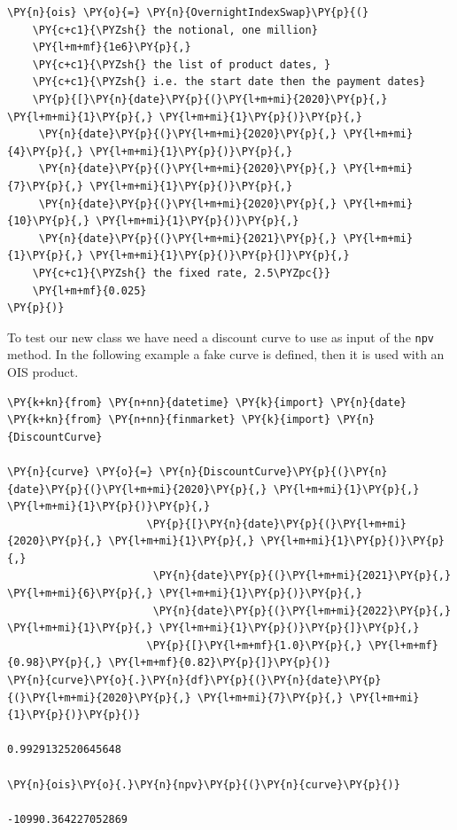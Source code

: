 \begin{tcolorbox}[breakable, size=fbox, boxrule=1pt, pad at break*=1mm,colback=cellbackground, colframe=cellborder]
\begin{Verbatim}[commandchars=\\\{\}]
\PY{n}{ois} \PY{o}{=} \PY{n}{OvernightIndexSwap}\PY{p}{(}
    \PY{c+c1}{\PYZsh{} the notional, one million}
    \PY{l+m+mf}{1e6}\PY{p}{,}
    \PY{c+c1}{\PYZsh{} the list of product dates, }
    \PY{c+c1}{\PYZsh{} i.e. the start date then the payment dates}
    \PY{p}{[}\PY{n}{date}\PY{p}{(}\PY{l+m+mi}{2020}\PY{p}{,} \PY{l+m+mi}{1}\PY{p}{,} \PY{l+m+mi}{1}\PY{p}{)}\PY{p}{,} 
     \PY{n}{date}\PY{p}{(}\PY{l+m+mi}{2020}\PY{p}{,} \PY{l+m+mi}{4}\PY{p}{,} \PY{l+m+mi}{1}\PY{p}{)}\PY{p}{,} 
     \PY{n}{date}\PY{p}{(}\PY{l+m+mi}{2020}\PY{p}{,} \PY{l+m+mi}{7}\PY{p}{,} \PY{l+m+mi}{1}\PY{p}{)}\PY{p}{,} 
     \PY{n}{date}\PY{p}{(}\PY{l+m+mi}{2020}\PY{p}{,} \PY{l+m+mi}{10}\PY{p}{,} \PY{l+m+mi}{1}\PY{p}{)}\PY{p}{,}
     \PY{n}{date}\PY{p}{(}\PY{l+m+mi}{2021}\PY{p}{,} \PY{l+m+mi}{1}\PY{p}{,} \PY{l+m+mi}{1}\PY{p}{)}\PY{p}{]}\PY{p}{,}
    \PY{c+c1}{\PYZsh{} the fixed rate, 2.5\PYZpc{}}
    \PY{l+m+mf}{0.025}
\PY{p}{)}
\end{Verbatim}
\end{tcolorbox}

To test our new class we have need a discount curve to use as input of the \texttt{npv} method. 
In the following example a fake curve is defined, then it is used with an OIS product.

\begin{tcolorbox}[breakable, size=fbox, boxrule=1pt, pad at break*=1mm,colback=cellbackground, colframe=cellborder]
\begin{Verbatim}[commandchars=\\\{\}]
\PY{k+kn}{from} \PY{n+nn}{datetime} \PY{k}{import} \PY{n}{date}
\PY{k+kn}{from} \PY{n+nn}{finmarket} \PY{k}{import} \PY{n}{DiscountCurve}
        
\PY{n}{curve} \PY{o}{=} \PY{n}{DiscountCurve}\PY{p}{(}\PY{n}{date}\PY{p}{(}\PY{l+m+mi}{2020}\PY{p}{,} \PY{l+m+mi}{1}\PY{p}{,} \PY{l+m+mi}{1}\PY{p}{)}\PY{p}{,}
                      \PY{p}{[}\PY{n}{date}\PY{p}{(}\PY{l+m+mi}{2020}\PY{p}{,} \PY{l+m+mi}{1}\PY{p}{,} \PY{l+m+mi}{1}\PY{p}{)}\PY{p}{,} 
                       \PY{n}{date}\PY{p}{(}\PY{l+m+mi}{2021}\PY{p}{,} \PY{l+m+mi}{6}\PY{p}{,} \PY{l+m+mi}{1}\PY{p}{)}\PY{p}{,} 
                       \PY{n}{date}\PY{p}{(}\PY{l+m+mi}{2022}\PY{p}{,} \PY{l+m+mi}{1}\PY{p}{,} \PY{l+m+mi}{1}\PY{p}{)}\PY{p}{]}\PY{p}{,}
                      \PY{p}{[}\PY{l+m+mf}{1.0}\PY{p}{,} \PY{l+m+mf}{0.98}\PY{p}{,} \PY{l+m+mf}{0.82}\PY{p}{]}\PY{p}{)}
\PY{n}{curve}\PY{o}{.}\PY{n}{df}\PY{p}{(}\PY{n}{date}\PY{p}{(}\PY{l+m+mi}{2020}\PY{p}{,} \PY{l+m+mi}{7}\PY{p}{,} \PY{l+m+mi}{1}\PY{p}{)}\PY{p}{)}

0.9929132520645648

\PY{n}{ois}\PY{o}{.}\PY{n}{npv}\PY{p}{(}\PY{n}{curve}\PY{p}{)}

-10990.364227052869
\end{Verbatim}
\end{tcolorbox}

